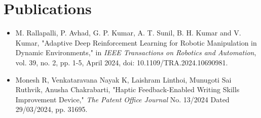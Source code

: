 \documentclass[a4paper,10pt]{article}
\begin{document}
\section*{Publications}
\begin{itemize}[leftmargin=1.5em, itemsep=0em, parsep=0pt]
  \item M. Rallapalli, P. Avhad, G. P. Kumar, A. T. Sunil, B. H. Kumar and V. Kumar, "Adaptive Deep Reinforcement Learning for Robotic Manipulation in Dynamic Environments," in \textit{IEEE Transactions on Robotics and Automation}, vol. 39, no. 2, pp. 1-5, April 2024, doi: 10.1109/TRA.2024.10690981.
  \item Monesh R, Venkataravana Nayak K, Laishram Linthoi, Munugoti Sai Ruthvik, Anusha Chakrabarti, "Haptic Feedback-Enabled Writing Skills Improvement Device," \textit{The Patent Office Journal} No. 13/2024 Dated 29/03/2024, pp. 31695.
\end{itemize}
\end{document}
